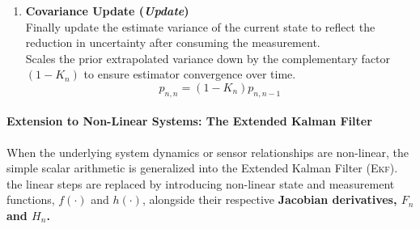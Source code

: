 \begin{enumerate}[label=\textbf{Step \arabic*:}, leftmargin=*, itemsep=1em]
	\item \textbf{Covariance Update (\emph{Update})}\\
	Finally update the estimate variance of the current state to reflect the reduction in uncertainty after consuming the measurement.%
	\\
	Scales the prior extrapolated variance down by the complementary factor $(1 - K_n)$ to ensure estimator convergence over time.
	\begin{equation}
		p_{n,n} = (1 - K_n)p_{n,n-1}
	\end{equation}
	
\end{enumerate}


\paragraph{Extension to Non-Linear Systems: The Extended Kalman Filter}
\label{sec:extended_kalman_filter}

When the underlying system dynamics or sensor relationships are non-linear, the simple scalar arithmetic is generalized into the Extended Kalman Filter (\textsc{Ekf}).%
the linear steps are replaced by introducing non-linear state and measurement functions, $f(\cdot)$ and $h(\cdot)$, alongside their respective \textbf{Jacobian derivatives, $F_n$ and $H_n$.}


